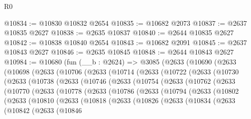 \begin{lexlean}{R0}
\begin{coremodule}
@10834 := @10830 @10832 @2654
@10835 := @10682 @2073
@10837 := @2637 @10835 @2627
@10838 := @2635 @10837
@10840 := @2644 @10835 @2627
@10842 := @10838 @10840 @2654
@10843 := @10682 @2091
@10845 := @2637 @10843 @2627
@10846 := @2635 @10845
@10848 := @2644 @10843 @2627
@10984 := @10680
    (fun (__b : @2624) =>
    @3085
      (@2633
        (@10690
          (@2633
            (@10698
              (@2633
                (@10706
                  (@2633
                    (@10714
                      (@2633
                        (@10722
                          (@2633
                            (@10730
                              (@2633
                                (@10738
                                  (@2633
                                    (@10746
                                      (@2633
                                        (@10754
                                          (@2633
                                            (@10762
                                              (@2633
                                                (@10770
                                                  (@2633
                                                    (@10778
                                                      (@2633
                                                        (@10786
                                                          (@2633
                                                            (@10794
                                                              (@2633
                                                                (@10802
                                                                  (@2633
                                                                    (@10810
                                                                      (@2633
                                                                        (@10818
                                                                          (@2633
                                                                            (@10826
                                                                              (@2633
                                                                                (@10834
                                                                                  (@2633
                                                                                    (@10842
                                                                                      (@2633
                                                                                        (@10846

\end{coremodule}
\end{lexlean}
